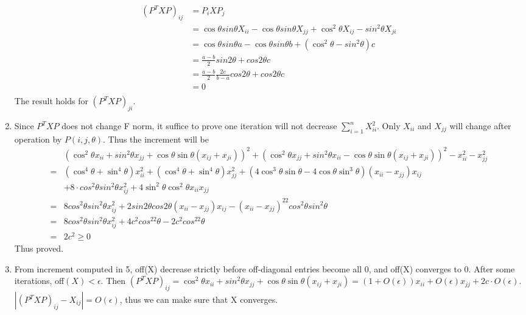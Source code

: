 \documentclass[10pt, oneside]{article}
\begin{document}
\begin{enumerate}
$$\begin{aligned}
	(P^TXP)_{ij}&=P_i X P_j\\
	&=\cos \theta sin \theta X_{ii} -\cos \theta sin \theta X_{jj} +\cos^2 \theta X_{ij} -sin^2\theta X_{ji}\\
	&=\cos \theta sin \theta a -\cos \theta sin \theta b +(\cos^2 \theta -sin^2\theta )c\\
	&=\frac{a-b}{2}sin2\theta+ cos 2 \theta c\\
	&=\frac{a-b}{2}\frac{2c}{b-a}cos2\theta+ cos 2 \theta c\\
	&=0\\
	\end{aligned}
	$$
	The result holds for $	(P^TXP)_{ji}$.
	\item Since $P^TXP$ does not change F norm, it suffice to prove one iteration will not decrease  $\sum_{i=1}^{n}X_{ii}^2$. Only $X_{ii}$ and $X_{jj}$ will change after operation by $P(i,j,\theta)$. Thus the increment will be 
	$$
	\begin{aligned}
&	(\cos^2 \theta x_{ii} + sin^2 \theta x_{jj} +\cos\theta\sin\theta( x_{ij}+x_{ji}))^2+(\cos^2 \theta x_{jj} + sin^2 \theta x_{ii} -\cos\theta\sin\theta( x_{ij}+x_{ji}))^2-x_{ii}^2-x_{jj}^2\\
=&\left(\cos ^{4} \theta+\sin ^{4} \theta\right) x_{ii}^{2}+\left(\cos ^{4} \theta+\sin ^{4} \theta\right) x_{jj}^{2}+\left(4 \cos ^{3} \theta \sin \theta-4 \cos \theta \sin ^{3} \theta\right)\left(x_{i i} - x_{j j}\right) x_{i j}\\
&+8 \cdot cos^2 \theta sin^{2} \theta x_{i j}^{2}+4 \sin ^{2} \theta \cos ^{2} \theta x_{i i} x_{j j}\\
=&8cos^2\theta sin^2\theta x_{ij}^2+2sin2\theta cos2\theta (x_{ii}-x_{jj})x_{ij}-(x_{ii}-x_{jj})^22cos^2\theta sin^2\theta\\
=&8cos^2\theta sin^2\theta x_{ij}^2+4c^2cos^22\theta -2c^2cos^22\theta\\
=&2c^2\geq0
	\end{aligned}	
	$$
	Thus proved.
	\item From increment computed in 5, off(X) decrease strictly before off-diagonal entries become all 0, and off(X) converges to 0. After some iterations, off$(X)<\epsilon$. Then $(P^TXP)_{ij}= \cos^2 \theta x_{ii} + sin^2 \theta x_{jj} +\cos\theta\sin\theta( x_{ij}+x_{ji})=(1+O(\epsilon))x_{ii}+O(\epsilon)x_{jj} +2c\cdot O(\epsilon)$. $|(P^TXP)_{ij}-X_{ij}|=O(\epsilon)$, thus we can make sure that X converges.  
	
\end{enumerate}
\end{document}
